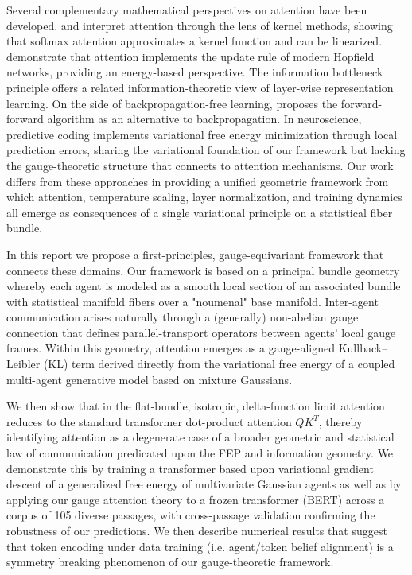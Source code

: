 \documentclass[twoside,11pt]{article}
\begin{document}
Several complementary mathematical perspectives on attention have been developed. \citet{tsai2019transformer} and \citet{katharopoulos2020transformers} interpret attention through the lens of kernel methods, showing that softmax attention approximates a kernel function and can be linearized. \citet{ramsauer2021hopfield} demonstrate that attention implements the update rule of modern Hopfield networks, providing an energy-based perspective. The information bottleneck principle \citep{tishby2015deep,shwartz2017opening} offers a related information-theoretic view of layer-wise representation learning. On the side of backpropagation-free learning, \citet{hinton2022forward} proposes the forward-forward algorithm as an alternative to backpropagation. In neuroscience, predictive coding \citep{rao1999predictive,bogacz2017tutorial,millidge2021predictive} implements variational free energy minimization through local prediction errors, sharing the variational foundation of our framework but lacking the gauge-theoretic structure that connects to attention mechanisms. Our work differs from these approaches in providing a unified geometric framework from which attention, temperature scaling, layer normalization, and training dynamics all emerge as consequences of a single variational principle on a statistical fiber bundle.

In this report we propose a first-principles, gauge-equivariant framework that connects these domains. Our framework is based on a principal bundle geometry whereby each agent is modeled as a smooth local section of an associated bundle with statistical manifold fibers over a "noumenal" base manifold. Inter-agent communication arises naturally through a (generally) non-abelian gauge connection that defines parallel-transport operators between agents' local gauge frames. Within this geometry, attention emerges as a gauge-aligned Kullback–Leibler (KL) term derived directly from the variational free energy of a coupled multi-agent generative model based on mixture Gaussians.

We then show that in the flat-bundle, isotropic, delta-function limit attention reduces to the standard transformer dot-product attention $QK^T$, thereby identifying attention as a degenerate case of a broader geometric and statistical law of communication predicated upon the FEP and information geometry.  We demonstrate this by training a transformer based upon variational gradient descent of a generalized free energy of multivariate Gaussian agents as well as by applying our gauge attention theory to a frozen transformer (BERT) across a corpus of 105 diverse passages, with cross-passage validation confirming the robustness of our predictions.  We then describe numerical results that suggest that token encoding under data training (i.e. agent/token belief alignment) is a symmetry breaking phenomenon of our gauge-theoretic framework.
\end{document}
